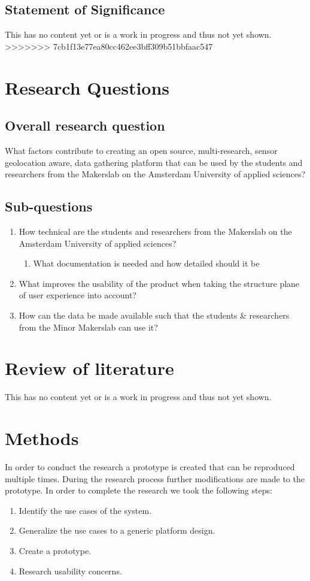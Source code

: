 \documentclass[conference]{IEEEtran}
\begin{document}
\subsection{Statement of Significance}
This has no content yet or is a work in progress and thus not yet shown.
>>>>>>> 7cb1f13e77ea80cc462ee3bff309b51bbfaac547

\section{Research Questions}

\subsection{Overall research question}
What factors contribute to creating an open source, multi-research, sensor geolocation aware, data gathering platform that can be used by the students and researchers from the Makerslab on the Amsterdam University of applied sciences?

\subsection{Sub-questions}
	\begin{enumerate}
		\item How technical are the students and researchers from the Makerslab on the Amsterdam University of applied sciences?
			\begin{enumerate}
				\item What documentation is needed and how detailed should it be
			\end{enumerate}
		\item What improves the usability of the product when taking the structure plane of user experience into account?
		\item How can the data be made available such that the students \& researchers from the Minor Makerslab can use it?
	\end{enumerate}

\section{Review of literature}
	This has no content yet or is a work in progress and thus not yet shown.

\section{Methods}
	In order to conduct the research a prototype is created that can be reproduced multiple times. During the research process further modifications are made to the prototype. In order to complete the research we took the following steps:
		\begin{enumerate}
			\item Identify the use cases of the system.
			\item Generalize the use cases to a generic platform design.
			\item Create a prototype.
			\item Research usability concerns.
		\end{enumerate}
\end{document}
